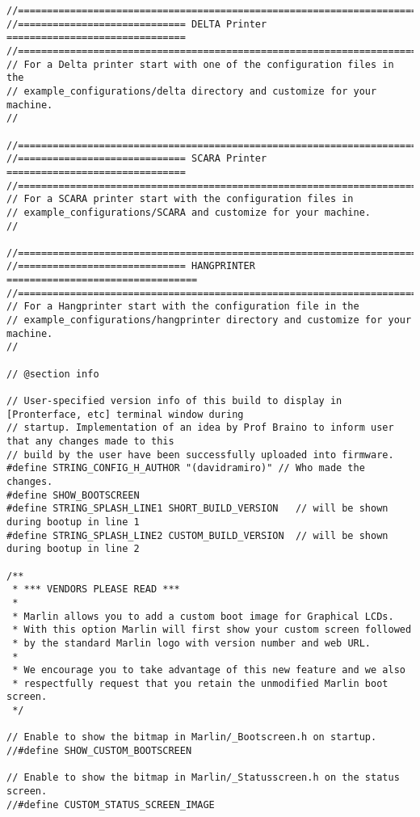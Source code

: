 \begin{lstlisting}[caption = キャプション, label = ラベル]
//===========================================================================
//============================= DELTA Printer ===============================
//===========================================================================
// For a Delta printer start with one of the configuration files in the
// example_configurations/delta directory and customize for your machine.
//

//===========================================================================
//============================= SCARA Printer ===============================
//===========================================================================
// For a SCARA printer start with the configuration files in
// example_configurations/SCARA and customize for your machine.
//

//===========================================================================
//============================= HANGPRINTER =================================
//===========================================================================
// For a Hangprinter start with the configuration file in the
// example_configurations/hangprinter directory and customize for your machine.
//

// @section info

// User-specified version info of this build to display in [Pronterface, etc] terminal window during
// startup. Implementation of an idea by Prof Braino to inform user that any changes made to this
// build by the user have been successfully uploaded into firmware.
#define STRING_CONFIG_H_AUTHOR "(davidramiro)" // Who made the changes.
#define SHOW_BOOTSCREEN
#define STRING_SPLASH_LINE1 SHORT_BUILD_VERSION   // will be shown during bootup in line 1
#define STRING_SPLASH_LINE2 CUSTOM_BUILD_VERSION  // will be shown during bootup in line 2

/**
 * *** VENDORS PLEASE READ ***
 *
 * Marlin allows you to add a custom boot image for Graphical LCDs.
 * With this option Marlin will first show your custom screen followed
 * by the standard Marlin logo with version number and web URL.
 *
 * We encourage you to take advantage of this new feature and we also
 * respectfully request that you retain the unmodified Marlin boot screen.
 */

// Enable to show the bitmap in Marlin/_Bootscreen.h on startup.
//#define SHOW_CUSTOM_BOOTSCREEN

// Enable to show the bitmap in Marlin/_Statusscreen.h on the status screen.
//#define CUSTOM_STATUS_SCREEN_IMAGE


\end{lstlisting}
